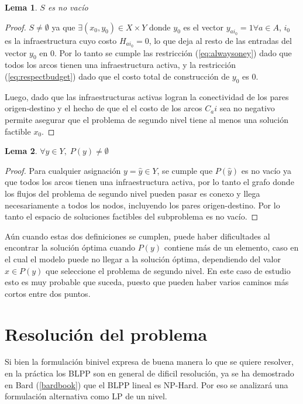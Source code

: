 \documentclass{article}
\newtheorem{lemma}{Lema}
\begin{document}
  \begin{lemma}$S$ es no vacío
  \end{lemma}

  \begin{proof}
    $S \neq \emptyset$ ya que $\exists (x_0, y_0) \in X \times Y$ donde $y_0$ es el vector $y_{ai_0} = 1 \forall a \in A$, $i_0$ es la infraestructura cuyo costo $H_{ai_0} = 0$, lo que deja al resto de las entradas del vector $y_0$ en $0$. Por lo tanto se cumple las restricción (\ref{eq:alwaysoney}) dado que todos los arcos tienen una infraestructura activa, y la restricción (\ref{eq:respectbudget}) dado que el costo total de construcción de $y_0$ es $0$.

    Luego, dado que las infraestructuras activas logran la conectividad de los pares origen-destino y el hecho de que el el costo de los arcos $C_ai$ sea no negativo permite asegurar que el problema de segundo nivel tiene al menos una solución factible $x_0$.
  \end{proof}

  \begin{lemma}$\forall y \in Y,\; P(y) \neq \emptyset$
  \end{lemma}

  \begin{proof}
    Para cualquier asignación $y = \hat{y} \in Y$, se cumple que $P(\hat{y})$ es no vacío ya que todos los arcos tienen una infraestructura activa, por lo tanto el grafo donde los flujos del problema de segundo nivel pueden pasar es conexo y llega necesariamente a todos los nodos, incluyendo los pares origen-destino. Por lo tanto el espacio de soluciones factibles del subproblema es no vacío. 
  \end{proof}

  Aún cuando estas dos definiciones se cumplen, puede haber dificultades al encontrar la solución óptima cuando $P(y)$ contiene más de un elemento, caso en el cual el modelo puede no llegar a la solución óptima, dependiendo del valor $x \in P(y)$ que seleccione el problema de segundo nivel. En este caso de estudio esto es muy probable que suceda, puesto que pueden haber varios caminos más cortos entre dos puntos.

  \section*{Resolución del problema}

  Si bien la formulación binivel expresa de buena manera lo que se quiere resolver, en la práctica los BLPP son en general de dificil resolución, ya se ha demostrado en Bard (\ref{bardbook}) que el BLPP lineal es NP-Hard. Por eso se analizará una formulación alternativa como LP de un nivel.
\end{document}
